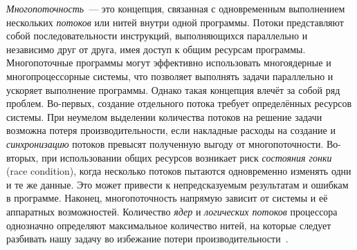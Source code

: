 \textit{Многопоточность}~--- это концепция, связанная с одновременным выполнением нескольких \textit{потоков} или нитей внутри одной программы. Потоки представляют собой последовательности инструкций, выполняющихся параллельно и независимо друг от друга, имея доступ к общим ресурсам программы. Многопоточные программы могут эффективно использовать многоядерные и многопроцессорные системы, что позволяет выполнять задачи параллельно и ускоряет выполнение программы. Однако такая концепция влечёт за собой ряд проблем. Во-первых, создание отдельного потока требует определённых ресурсов системы. При неумелом выделении количества потоков на решение задачи возможна потеря производительности, если накладные расходы на создание и \textit{синхронизацию} потоков превысят полученную выгоду от многопоточности. Во-вторых, при использовании общих ресурсов возникает риск \textit{состояния гонки} (race condition), когда несколько потоков пытаются одновременно изменять одни и те же данные. Это может привести к непредсказуемым результатам и ошибкам в программе. Наконец, многопоточность напрямую зависит от системы и её аппаратных возможностей. Количество \textit{ядер} и \textit{логических потоков} процессора однозначно определяют максимальное количество нитей, на которые следует разбивать нашу задачу во избежание потери производительности~\cite{Roberts2006MultiCorePI}.

